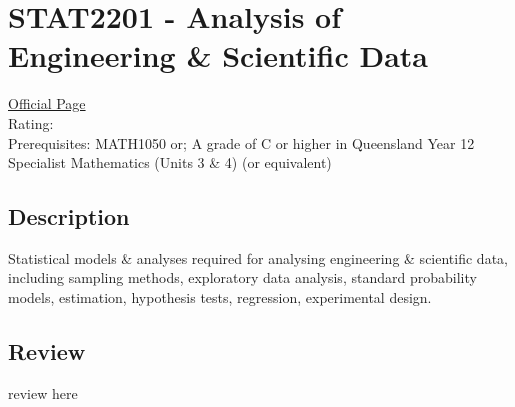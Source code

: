 \hypertarget{STAT2201}{\section{STAT2201 - Analysis of Engineering \& Scientific Data}}

\large
\textcolor{turbo_purple}{\href{https://my.uq.edu.au/programs-courses/course.html?course_code=STAT2201}{Official Page}} \\
Rating: \cstar\cstar\cstar\cstar\ostar \\
Prerequisites: MATH1050 or;
A grade of C or higher in Queensland Year 12 Specialist Mathematics (Units 3 \& 4) (or equivalent)

\normalsize
\subsection*{Description}
Statistical models \& analyses required for analysing engineering \& scientific data, including sampling methods, exploratory data analysis, standard probability models, estimation, hypothesis tests, regression, experimental design.

\subsection*{Review}
review here
